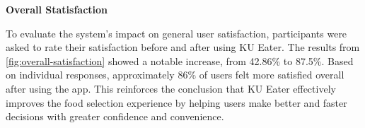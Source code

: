 \textbf{Overall Statisfaction}

To evaluate the system's impact on general user satisfaction,
participants were asked to rate their satisfaction before and after using KU Eater.
The results from \ref{fig:overall-satisfaction} showed a notable increase, from 42.86\% to 87.5\%.
Based on individual responses, approximately 86\% of users felt more satisfied
overall after using the app. This reinforces the conclusion that KU Eater effectively
improves the food selection experience by helping users make better and faster decisions
with greater confidence and convenience.